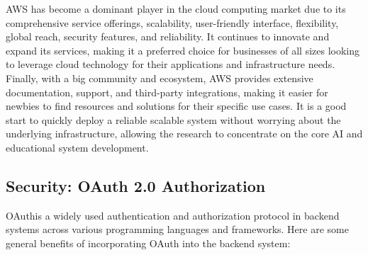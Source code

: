 AWS has become a dominant player in the cloud computing market due to its comprehensive service offerings, scalability, user-friendly interface, flexibility, global reach, security features, and reliability. It continues to innovate and expand its services, making it a preferred choice for businesses of all sizes looking to leverage cloud technology for their applications and infrastructure needs. Finally, with a big community and ecosystem, AWS provides extensive documentation, support, and third-party integrations, making it easier for newbies to find resources and solutions for their specific use cases. It is a good start to quickly deploy a reliable scalable system without worrying about the underlying infrastructure, allowing the research to concentrate on the core AI and educational system development.
\subsection{Security: OAuth 2.0 Authorization}

OAuthis a widely used authentication and authorization protocol in backend systems across various programming languages and frameworks. Here are some general benefits of incorporating OAuth into the backend system:

